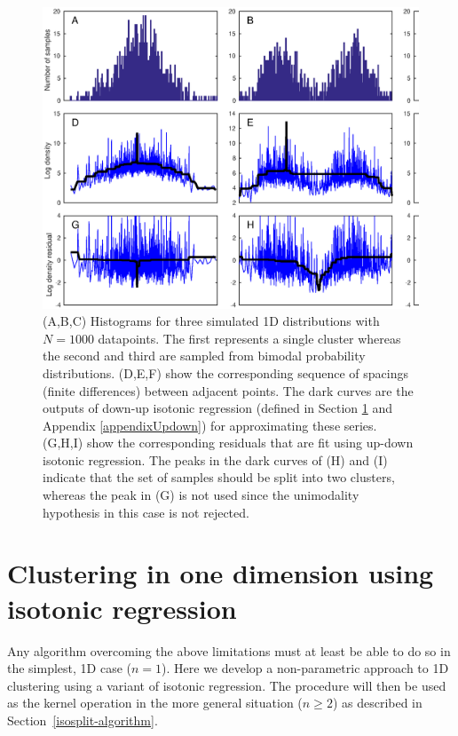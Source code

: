 \documentclass[10pt]{article}
\begin{document}
\begin{figure}
\begin{center}
\includegraphics[width=5.5in]{images/illustration_1d.eps}
\end{center}
\caption{
(A,B,C) Histograms for three simulated 1D distributions with $N=1000$ datapoints. The first represents a single cluster whereas the second and third are sampled from bimodal probability distributions. (D,E,F) show the corresponding sequence of spacings (finite differences) between adjacent points. The dark curves are the outputs of down-up isotonic regression (defined in Section \ref{clustering_1d} and Appendix \ref{appendixUpdown}) for approximating these series. (G,H,I) show the corresponding residuals that are fit using up-down isotonic regression. The peaks in the dark curves of (H) and (I) indicate that the set of samples should be split into two clusters, whereas the peak in (G) is not used since the unimodality hypothesis in this case is not rejected.
}
\label{fig:plots_1d}
\end{figure}

\section {Clustering in one dimension using isotonic regression}
\label{clustering_1d}

Any algorithm overcoming the above limitations must at least be able to do so in the simplest, 1D case ($n=1$). Here we develop a non-parametric approach to 1D clustering using a variant of isotonic regression. The procedure will then be used as the kernel operation in the more general situation ($n\geq2$) as described in Section~\ref{isosplit-algorithm}.
\end{document}
